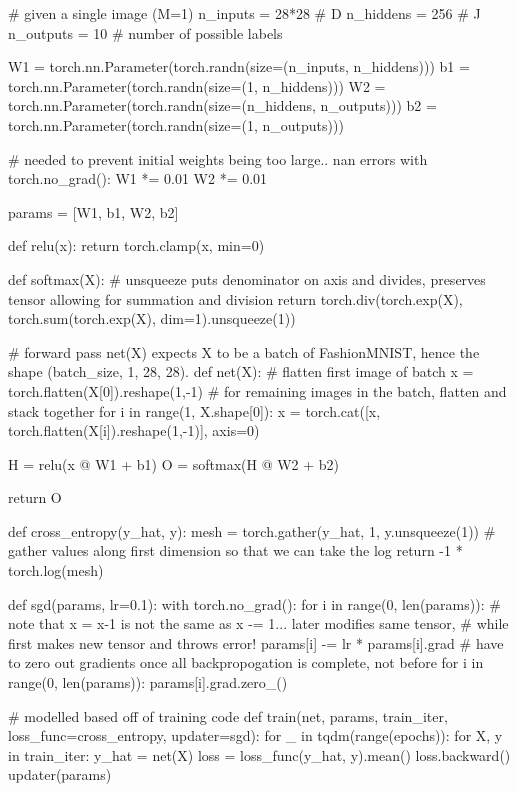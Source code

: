 \documentclass[submit]{harvardml}
\begin{document}
\begin{python}
# given a single image (M=1)
n_inputs = 28*28  # D
n_hiddens = 256  # J
n_outputs = 10     # number of possible labels

W1 = torch.nn.Parameter(torch.randn(size=(n_inputs, n_hiddens)))
b1 = torch.nn.Parameter(torch.randn(size=(1, n_hiddens)))
W2 = torch.nn.Parameter(torch.randn(size=(n_hiddens, n_outputs)))
b2 = torch.nn.Parameter(torch.randn(size=(1, n_outputs)))

# needed to prevent initial weights being too large.. nan errors
with torch.no_grad():
    W1 *= 0.01
    W2 *= 0.01
    
params = [W1, b1, W2, b2]



def relu(x):
    return torch.clamp(x, min=0)

def softmax(X):
    # unsqueeze puts denominator on axis and divides, preserves tensor allowing for summation and division
    return torch.div(torch.exp(X), torch.sum(torch.exp(X), dim=1).unsqueeze(1))


# forward pass net(X) expects X to be a batch of FashionMNIST, hence the shape (batch_size, 1, 28, 28).
def net(X):
    # flatten first image of batch
    x = torch.flatten(X[0]).reshape(1,-1)
    # for remaining images in the batch, flatten and stack together
    for i in range(1, X.shape[0]):
        x = torch.cat([x, torch.flatten(X[i]).reshape(1,-1)], axis=0)
        
    H = relu(x @ W1 + b1)
    O = softmax(H @ W2 + b2)
    
    return O


def cross_entropy(y_hat, y):
    mesh = torch.gather(y_hat, 1, y.unsqueeze(1))   # gather values along first dimension so that we can take the log
    return -1 * torch.log(mesh)

def sgd(params, lr=0.1):
    with torch.no_grad():
        for i in range(0, len(params)):
            # note that x = x-1 is not the same as x -= 1... later modifies same tensor, 
            # while first makes new tensor and throws error!
            params[i] -= lr * params[i].grad
        # have to zero out gradients once all backpropogation is complete, not before
        for i in range(0, len(params)):
            params[i].grad.zero_()


# modelled based off of training code
def train(net, params, train_iter, loss_func=cross_entropy, updater=sgd):
    for _ in tqdm(range(epochs)):
        for X, y in train_iter:
            y_hat = net(X)
            loss = loss_func(y_hat, y).mean()
            loss.backward()
            updater(params)
\end{python}
\end{document}
